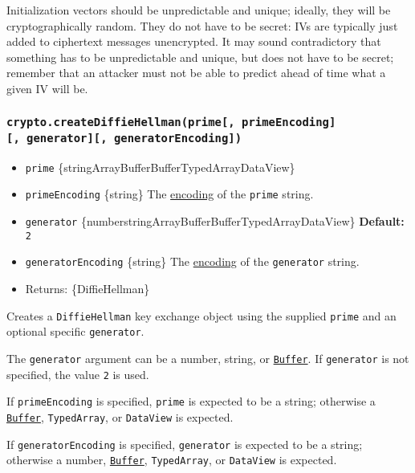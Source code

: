 Initialization vectors should be unpredictable and unique; ideally, they
will be cryptographically random. They do not have to be secret: IVs are
typically just added to ciphertext messages unencrypted. It may sound
contradictory that something has to be unpredictable and unique, but
does not have to be secret; remember that an attacker must not be able
to predict ahead of time what a given IV will be.

\subsubsection{\texorpdfstring{\texttt{crypto.createDiffieHellman(prime{[},\ primeEncoding{]}{[},\ generator{]}{[},\ generatorEncoding{]})}}{crypto.createDiffieHellman(prime{[}, primeEncoding{]}{[}, generator{]}{[}, generatorEncoding{]})}}\label{crypto.creatediffiehellmanprime-primeencoding-generator-generatorencoding}

\begin{itemize}
\tightlist
\item
  \texttt{prime}
  \{string\textbar ArrayBuffer\textbar Buffer\textbar TypedArray\textbar DataView\}
\item
  \texttt{primeEncoding} \{string\} The
  \href{buffer.md\#buffers-and-character-encodings}{encoding} of the
  \texttt{prime} string.
\item
  \texttt{generator}
  \{number\textbar string\textbar ArrayBuffer\textbar Buffer\textbar TypedArray\textbar DataView\}
  \textbf{Default:} \texttt{2}
\item
  \texttt{generatorEncoding} \{string\} The
  \href{buffer.md\#buffers-and-character-encodings}{encoding} of the
  \texttt{generator} string.
\item
  Returns: \{DiffieHellman\}
\end{itemize}

Creates a \texttt{DiffieHellman} key exchange object using the supplied
\texttt{prime} and an optional specific \texttt{generator}.

The \texttt{generator} argument can be a number, string, or
\href{buffer.md}{\texttt{Buffer}}. If \texttt{generator} is not
specified, the value \texttt{2} is used.

If \texttt{primeEncoding} is specified, \texttt{prime} is expected to be
a string; otherwise a \href{buffer.md}{\texttt{Buffer}},
\texttt{TypedArray}, or \texttt{DataView} is expected.

If \texttt{generatorEncoding} is specified, \texttt{generator} is
expected to be a string; otherwise a number,
\href{buffer.md}{\texttt{Buffer}}, \texttt{TypedArray}, or
\texttt{DataView} is expected.

